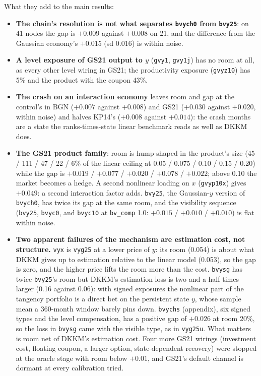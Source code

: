 \documentclass[11pt]{article}
\begin{document}
\noindent What they add to the main results:
\begin{itemize}
\item \textbf{The chain's resolution is not what separates \texttt{bvych0} from \texttt{bvy25}}: on 41 nodes the gap is $+0.009$ against $+0.008$ on 21, and the difference from the Gaussian economy's $+0.015$ (sd 0.016) is within noise.
\item \textbf{A level exposure of GS21 output to $y$} (\texttt{gvy1}, \texttt{gvy1j}) has no room at all, as every other level wiring in GS21; the productivity exposure (\texttt{gvyz10}) has 5\% and the product with the coupon 43\%.
\item \textbf{The crash on an interaction economy} leaves room and gap at the control's in BGN ($+0.007$ against $+0.008$) and GS21 ($+0.030$ against $+0.020$, within noise) and halves KP14's ($+0.008$ against $+0.014$): the crash months are a state the ranks-times-state linear benchmark reads as well as DKKM does.
\item \textbf{The GS21 product family}: room is hump-shaped in the product's size (45 / 111 / 47 / 22 / 6\% of the linear ceiling at 0.05 / 0.075 / 0.10 / 0.15 / 0.20) while the gap is $+0.019$ / $+0.077$ / $+0.020$ / $+0.078$ / $+0.022$; above 0.10 the market becomes a hedge. A second nonlinear loading on $x$ (\texttt{gvyp10x}) gives $+0.049$: a second interaction factor adds. \texttt{bvy25}, the Gaussian-$y$ version of \texttt{bvych0}, has twice its gap at the same room, and the visibility sequence (\texttt{bvy25}, \texttt{bvyc0}, and \texttt{bvyc10} at \texttt{bv\_comp} 1.0: $+0.015$ / $+0.010$ / $+0.010$) is flat within noise.
\item \textbf{Two apparent failures of the mechanism are estimation cost, not structure.} \texttt{vyx} is \texttt{vyg25} at a lower price of $y$: its room (0.054) is about what DKKM gives up to estimation relative to the linear model (0.053), so the gap is zero, and the higher price lifts the room more than the cost. \texttt{bvysg} has twice \texttt{bvy25}'s room but DKKM's estimation loss is two and a half times larger (0.16 against 0.06): with signed exposures the nonlinear part of the tangency portfolio is a direct bet on the persistent state $y$, whose sample mean a 360-month window barely pins down. \texttt{bvychs} (appendix), six signed types and the level compensation, has a positive gap of $+0.026$ at room 20\%, so the loss in \texttt{bvysg} came with the visible type, as in \texttt{vyg25u}. What matters is room net of DKKM's estimation cost. Four more GS21 wirings (investment cost, floating coupon, a larger option, state-dependent recovery) were stopped at the oracle stage with room below $+0.01$, and GS21's default channel is dormant at every calibration tried.

\end{itemize}
\end{document}
